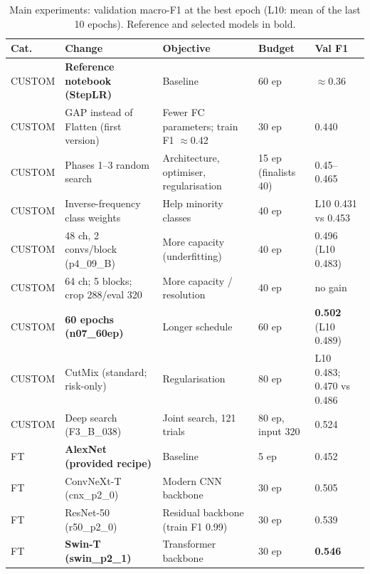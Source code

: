 \setlength{\abovecaptionskip}{2pt}
\setlength{\belowcaptionskip}{0pt}
\setlength{\textfloatsep}{4pt}
\setlength{\floatsep}{4pt}
\setlength{\intextsep}{3pt}

\begin{table}[H]
\centering\scriptsize
\caption{Main experiments: validation macro-F1 at the best epoch (L10: mean of the last 10 epochs). Reference and selected models in bold.}
\label{tab:experiments}
\setlength{\tabcolsep}{3pt}\renewcommand{\arraystretch}{0.95}
\begin{tabularx}{\linewidth}{@{}l l X l l@{}}
\toprule
Cat. & Change & Objective & Budget & Val F1 \\
\midrule
CUSTOM & \textbf{Reference notebook (StepLR)} & Baseline & 60 ep & $\approx$0.36 \\
CUSTOM & GAP instead of Flatten (first version) & Fewer FC parameters; train F1 $\approx$0.42 & 30 ep & 0.440 \\
CUSTOM & Phases 1--3 random search & Architecture, optimiser, regularisation & 15 ep (finalists 40) & 0.45--0.465 \\
CUSTOM & Inverse-frequency class weights & Help minority classes & 40 ep & L10 0.431 vs 0.453 \\
CUSTOM & 48 ch, 2 convs/block (p4\_09\_B) & More capacity (underfitting) & 40 ep & 0.496 (L10 0.483) \\
CUSTOM & 64 ch; 5 blocks; crop 288/eval 320 & More capacity / resolution & 40 ep & no gain \\
CUSTOM & \textbf{60 epochs (n07\_60ep)} & Longer schedule & 60 ep & \textbf{0.502} (L10 0.489) \\
CUSTOM & CutMix (standard; risk-only) & Regularisation & 80 ep & L10 0.483; 0.470 vs 0.486 \\
CUSTOM & Deep search (F3\_B\_038) & Joint search, 121 trials & 80 ep, input 320 & 0.524 \\
\midrule
FT & \textbf{AlexNet (provided recipe)} & Baseline & 5 ep & 0.452 \\
FT & ConvNeXt-T (cnx\_p2\_0) & Modern CNN backbone & 30 ep & 0.505 \\
FT & ResNet-50 (r50\_p2\_0) & Residual backbone (train F1 0.99) & 30 ep & 0.539 \\
FT & \textbf{Swin-T (swin\_p2\_1)} & Transformer backbone & 30 ep & \textbf{0.546} \\
\bottomrule
\end{tabularx}
\end{table}

